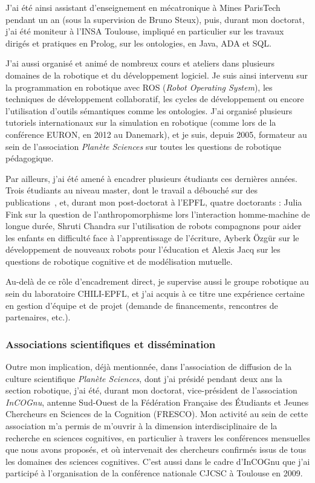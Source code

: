 \documentclass[a4paper]{article}
\begin{document}
J'ai été ainsi assistant d'enseignement en mécatronique à Mines ParisTech
pendant un an (sous la supervision de Bruno Steux), puis, durant mon doctorat,
j'ai été moniteur à l'INSA Toulouse, impliqué en particulier sur les travaux
dirigés et pratiques en Prolog, sur les ontologies, en Java, ADA et SQL.

J'ai aussi organisé et animé de nombreux cours et ateliers dans plusieurs
domaines de la robotique et du développement logiciel. Je suis ainsi intervenu
sur la programmation en robotique avec ROS (\emph{Robot Operating System}), les
techniques de développement collaboratif, les cycles de développement ou encore
l'utilisation d'outils sémantiques comme les ontologies. J'ai organisé plusieurs
tutoriels internationaux sur la simulation en robotique (comme lors de la
conférence EURON, en 2012 au Danemark), et je suis, depuis 2005, formateur au
sein de l'association \emph{Planète Sciences} sur toutes les questions de
robotique pédagogique.

Par ailleurs, j'ai été amené à encadrer plusieurs étudiants ces dernières
années. Trois étudiants au niveau master, dont le travail a débouché sur des
publications~\cite{lemaignan2011grounding,hood2015when,hood2015cowriter}, et,
durant mon post-doctorat à l'EPFL, quatre doctorants : Julia Fink sur la question
de l'anthropomorphisme lors l'interaction homme-machine de longue durée, Shruti
Chandra sur l'utilisation de robots compagnons pour aider les enfants en
difficulté face à l'apprentissage de l'écriture, Ayberk Özgür sur le
développement de nouveaux robots pour l'éducation et Alexis Jacq sur les
questions de robotique cognitive et de modélisation mutuelle.

Au-delà de ce rôle d'encadrement direct, je supervise aussi le groupe robotique
au sein du laboratoire CHILI-EPFL, et j'ai acquis à ce titre une expérience
certaine en gestion d'équipe et de projet (demande de financements, rencontres
de partenaires, etc.).

\subsubsection*{Associations scientifiques et dissémination}

Outre mon implication, déjà mentionnée, dans l'association de diffusion de la
culture scientifique \emph{Planète Sciences}, dont j'ai présidé pendant deux ans
la section robotique, j'ai été, durant mon doctorat, vice-président de
l'association \emph{InCOGnu}, antenne Sud-Ouest de la Fédération Française des
Étudiants et Jeunes Chercheurs en Sciences de la Cognition (FRESCO). Mon
activité au sein de cette association m'a permis de m'ouvrir à la dimension
interdisciplinaire de la recherche en sciences cognitives, en particulier à
travers les conférences mensuelles que nous avons proposés, et où intervenait
des chercheurs confirmés issus de tous les domaines des sciences cognitives.
C'est aussi dans le cadre d'InCOGnu que j'ai participé à l'organisation de la
conférence nationale CJCSC à Toulouse en 2009.
\end{document}
